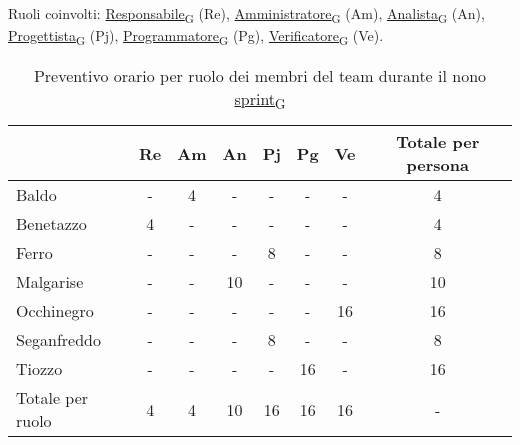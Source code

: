 \newpage
{}
Ruoli coinvolti: \href{https://7last.github.io/docs/pb/documentazione-interna/glossario\#responsabile}{Responsabile\textsubscript{G}} (Re), \href{https://7last.github.io/docs/pb/documentazione-interna/glossario\#amministratore}{Amministratore\textsubscript{G}} (Am), \href{https://7last.github.io/docs/pb/documentazione-interna/glossario\#analista}{Analista\textsubscript{G}} (An), \href{https://7last.github.io/docs/pb/documentazione-interna/glossario\#progettista}{Progettista\textsubscript{G}} (Pj), \href{https://7last.github.io/docs/pb/documentazione-interna/glossario\#programmatore}{Programmatore\textsubscript{G}} (Pg), \href{https://7last.github.io/docs/pb/documentazione-interna/glossario\#verificatore}{Verificatore\textsubscript{G}} (Ve).
\begin{table}[!h]
	\centering
	\begin{tabular}{ | l | c | c | c | c | c | c | c | }
		\hline
		\textbf{} & \textbf{Re} & \textbf{Am} &\textbf{An} & \textbf{Pj} & \textbf{Pg} & \textbf{Ve} & \textbf{Totale per persona} \\
		\hline			    %
		Baldo            &  -   &  4   &  -   &  -   &  -   &  -   &  4   \\
		Benetazzo        &  4   &  -   &  -   &  -   &  -   &  -   &  4   \\
		Ferro            &  -   &  -   &  -   &  8   &  -   &  -   &  8   \\
		Malgarise        &  -   &  -   & 10   &  -   &  -   &  -   & 10   \\
		Occhinegro       &  -   &  -   &  -   &  -   &  -   & 16   & 16   \\
		Seganfreddo      &  -   &  -   &  -   &  8   &  -   &  -   &  8   \\
		Tiozzo           &  -   &  -   &  -   &  -   & 16   &  -   & 16   \\
		\hline
		Totale per ruolo &  4   &  4   & 10   & 16   & 16   & 16   &  -   \\
		\hline
	\end{tabular}
	\caption{Preventivo orario per ruolo dei membri del team durante il nono \href{https://7last.github.io/docs/pb/documentazione-interna/glossario\#sprint}{sprint\textsubscript{G}}}

\end{table}

